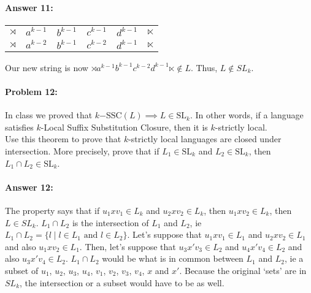 \documentclass[12pt, letterpaper]{article}
\begin{document}
\paragraph{Answer 11:}\begin{center}
\begin{tabular}{cc|c|ccc}
    $\rtimes$ & $a^{k-1}$ & $b^{k-1}$ & $c^{k-1}$ & $d^{k-1}$ & $\ltimes$ \\
    $\rtimes$ & $a^{k-2}$ & $b^{k-1}$ & $c^{k-2}$ & $d^{k-1}$ & $\ltimes$
\end{tabular}
\end{center}

Our new string is now $\rtimes a^{k-1} b^{k-1} c^{k-2} d^{k-1}\ltimes \notin L$. Thus, $L \notin SL_k$.

\hrulefill
\paragraph{Problem 12:}

In class we proved that
$k\mathrm{-SSC}(L) \implies L \in \mathrm{SL}_k$. In other words, if a
language satisfies $k$-Local Suffix Substitution Closure, then it is
$k$-strictly local.\\

\noindent Use this theorem to prove that $k$-strictly local languages
are closed under intersection. More precisely, prove that if
$L_1 \in \mathrm{SL}_k$ and $L_2 \in \mathrm{SL}_k$, then
$L_1 \cap L_2 \in \mathrm{SL}_k$.

\paragraph{Answer 12:} 

The property says that if $u_1xv_1\in L_k$ and $u_2xv_2\in L_k$, then $u_1xv_2\in L_k$, then $L\in SL_k$. $L_1 \cap L_2$ is the intersection of $L_1$ and $L_2$, ie $ L_1 \cap L_2 = \{l \mid l \in L_1 \text{ and } l \in L_2\}$. Let's suppose that $u_1xv_1\in L_1$ and $u_2xv_2\in L_1$ and also $u_1xv_2\in L_1$. Then, let's suppose that $u_3x'v_3\in L_2$ and $u_4x'v_4\in L_2$ and also $u_3x'v_4\in L_2$. $L_1 \cap L_2$ would be what is in common between $L_1$ and $L_2$, ie a subset of $u_1$, $u_2$, $u_3$, $u_4$, $v_1$, $v_2$, $v_3$, $v_4$, $x$ and $x'$. Because the original `sets' are in $SL_k$, the intersection or a subset would have to be as well. 
\end{document}
